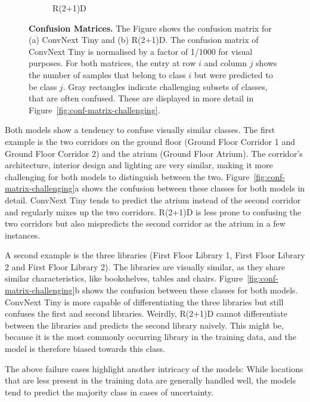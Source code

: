 \documentclass[a4paper]{article}
\begin{document}
\begin{figure}
\begin{subfigure}[b]{0.49\textwidth}
    \caption{R(2+1)D}
  \end{subfigure}
  \caption{ \textbf{Confusion Matrices.} The Figure shows the confusion matrix
    for (a) ConvNext Tiny and (b) R(2+1)D. The confusion matrix of ConvNext Tiny
    is normalised by a factor of 1/1000 for visual purposes. For both matrices,
    the entry at row $i$ and column $j$ shows the number of samples that belong
  to class $i$ but were predicted to be class $j$. Gray rectangles indicate
challenging subsets of classes, that are often confused. These are displayed in
more detail in Figure~\ref{fig:conf-matrix-challenging}. }
  \label{fig:conf-matrix}
\end{figure}

Both models show a tendency to confuse visually similar classes. The first
example is the two corridors on the ground floor (Ground Floor Corridor 1 and
Ground Floor Corridor 2) and the atrium (Ground Floor Atrium). The corridor's
architecture, interior design and lighting are very similar, making it more
challenging for both models to distinguish between the two.
Figure~\ref{fig:conf-matrix-challenging}a shows the confusion between these
classes for both models in detail. ConvNext Tiny tends to predict the atrium
instead of the second corridor and regularly mixes up the two corridors. R(2+1)D
is less prone to confusing the two corridors but also mispredicts the second
corridor as the atrium in a few instances.

A second example is the three libraries (First Floor Library 1, First Floor
Library 2 and First Floor Library 2). The libraries are visually similar, as
they share similar characteristics, like bookshelves, tables and chairs.
Figure~\ref{fig:conf-matrix-challenging}b shows the confusion between these
classes for both models. ConvNext Tiny is more capable of differentiating the
three libraries but still confuses the first and second libraries. Weirdly,
R(2+1)D cannot differentiate between the libraries and predicts the second
library naively. This might be, because it is the most commonly occurring
library in the training data, and the model is therefore biased towards this
class.

The above failure cases highlight another intricacy of the models: While
locations that are less present in the training data are generally handled well,
the models tend to predict the majority class in cases of uncertainty.
\end{document}
